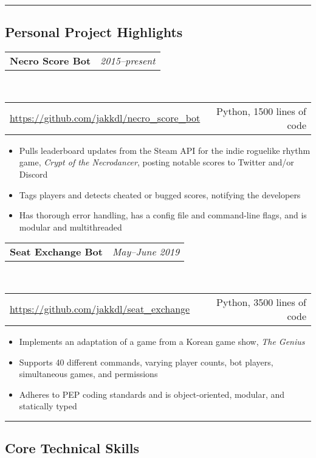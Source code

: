 \documentclass[10pt,letterpaper]{article}
\makeatletter
\newcommand{\headerrow}[2]
{\begin{tabular*}{\linewidth}{l@{\extracolsep{\fill}}r}
    #1 &
    #2 \\
\end{tabular*}}
\makeatother
\begin{document}
\hrule
\vspace{-0.4em}
\subsection*{Personal Project Highlights}


\headerrow
    {\textbf{Necro Score Bot}}
    {\emph{2015--present}}
\\
\headerrow
    {\url{https://github.com/jakkdl/necro\_score\_bot}}
    {Python, 1500 lines of code}
\begin{itemize}[noitemsep, topsep=0pt]
    \item Pulls leaderboard updates from the Steam API for the indie roguelike
        rhythm game, \emph{Crypt of the Necrodancer}, posting notable scores
        to Twitter and/or Discord
    \item Tags players and detects cheated or bugged scores, notifying the
        developers
    \item Has thorough error handling, has a config file and command-line
        flags, and is modular and multithreaded
\end{itemize}

\vspace{0.5em}
\headerrow
    {\textbf{Seat Exchange Bot}}
    {\emph{May--June 2019}}
\\
\headerrow
    {\url{https://github.com/jakkdl/seat\_exchange}}
    {Python, 3500 lines of code}
\begin{itemize}[noitemsep, topsep=0pt]
    \item Implements an adaptation of a game from a Korean game show, \emph{The
        Genius}
    \item Supports 40 different commands, varying player counts,
        bot players, simultaneous games, and permissions
    \item Adheres to PEP coding standards and is object-oriented, modular,
        and statically typed
\end{itemize}



\vspace{0.5em}
\hrule
\vspace{-0.4em}
\subsection*{Core Technical Skills}
\end{document}
